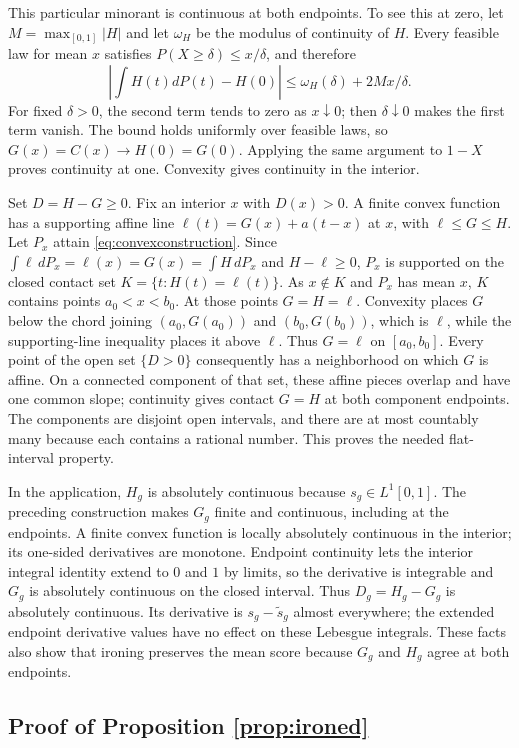 \documentclass[11pt]{article}
\begin{document}
This particular minorant is continuous at both endpoints. To see this at zero, let $M=\max_{[0,1]}|H|$ and let $\omega_H$ be the modulus of continuity of $H$. Every feasible law for mean $x$ satisfies $P(X\ge\delta)\le x/\delta$, and therefore
\[
\left|\int H(t)dP(t)-H(0)\right|\le\omega_H(\delta)+2M x/\delta.
\]
For fixed $\delta>0$, the second term tends to zero as $x\downarrow0$; then $\delta\downarrow0$ makes the first term vanish. The bound holds uniformly over feasible laws, so $G(x)=C(x)\to H(0)=G(0)$. Applying the same argument to $1-X$ proves continuity at one. Convexity gives continuity in the interior.

Set $D=H-G\ge0$. Fix an interior $x$ with $D(x)>0$. A finite convex function has a supporting affine line $\ell(t)=G(x)+a(t-x)$ at $x$, with $\ell\le G\le H$. Let $P_x$ attain \eqref{eq:convexconstruction}. Since $\int\ell\,dP_x=\ell(x)=G(x)=\int H\,dP_x$ and $H-\ell\ge0$, $P_x$ is supported on the closed contact set $K=\{t:H(t)=\ell(t)\}$. As $x\notin K$ and $P_x$ has mean $x$, $K$ contains points $a_0<x<b_0$. At those points $G=H=\ell$. Convexity places $G$ below the chord joining $(a_0,G(a_0))$ and $(b_0,G(b_0))$, which is $\ell$, while the supporting-line inequality places it above $\ell$. Thus $G=\ell$ on $[a_0,b_0]$. Every point of the open set $\{D>0\}$ consequently has a neighborhood on which $G$ is affine. On a connected component of that set, these affine pieces overlap and have one common slope; continuity gives contact $G=H$ at both component endpoints. The components are disjoint open intervals, and there are at most countably many because each contains a rational number. This proves the needed flat-interval property.

In the application, $H_g$ is absolutely continuous because $s_g\in L^1[0,1]$. The preceding construction makes $G_g$ finite and continuous, including at the endpoints. A finite convex function is locally absolutely continuous in the interior; its one-sided derivatives are monotone. Endpoint continuity lets the interior integral identity extend to $0$ and $1$ by limits, so the derivative is integrable and $G_g$ is absolutely continuous on the closed interval. Thus $D_g=H_g-G_g$ is absolutely continuous. Its derivative is $s_g-\widetilde s_g$ almost everywhere; the extended endpoint derivative values have no effect on these Lebesgue integrals. These facts also show that ironing preserves the mean score because $G_g$ and $H_g$ agree at both endpoints.

\subsection{Proof of Proposition \ref{prop:ironed}}\label{app:ironedproof}
\end{document}
